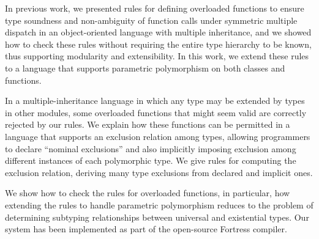 In previous work,
we presented rules for defining overloaded functions 
to ensure type soundness 
and non-ambiguity of function calls under symmetric multiple dispatch 
in an object-oriented language with multiple inheritance, 
and we showed how to check these rules 
without requiring the entire type hierarchy to be known,
thus supporting modularity and extensibility.
In this work, 
we extend these rules
to a language that supports parametric polymorphism 
on both classes and functions.

In a multiple-inheritance language 
in which any type may be extended by types in other modules,
some overloaded functions that might seem valid 
are correctly rejected by our rules.
We explain how these functions can be permitted
in a language that supports an exclusion relation among types, 
allowing programmers to declare ``nominal exclusions''
and also implicitly imposing exclusion 
among different instances of each polymorphic type.
We give rules for computing the exclusion relation, 
deriving many type exclusions from declared and implicit ones.

We show how to check the rules for overloaded functions, 
in particular, 
how extending the rules to handle parametric polymorphism 
reduces to the problem of determining subtyping relationships
between universal and existential types.
Our system has been implemented as part of the open-source Fortress compiler.

